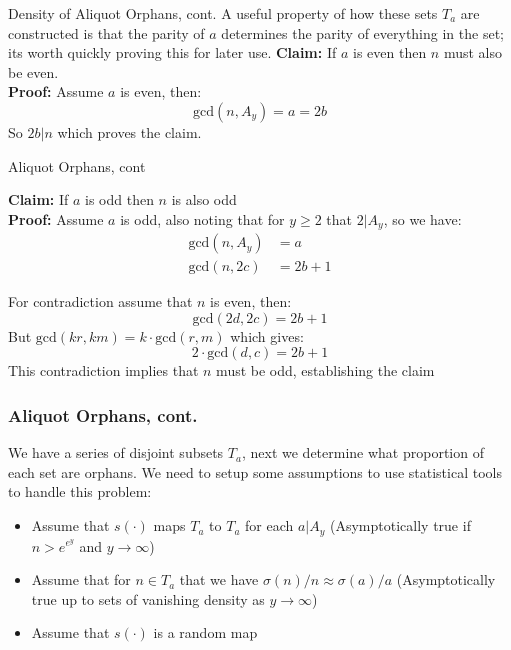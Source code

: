 \documentclass{beamer}
\begin{document}
\begin{frame}{Density of Aliquot Orphans, cont.}
A useful property of how these sets $T_a$ are constructed is that the parity of $a$ determines the parity of everything in the set; its worth quickly proving this for later use.\linebreak\linebreak
    \textbf{Claim:} If $a$ is even then $n$ must also be even.\\
   \textbf{Proof:} Assume $a$ is even, then: 
    $$\text{gcd}(n, A_y) = a = 2b$$
    So  $2b|n$ which proves the claim.\\
   
    
\end{frame}



\begin{frame}{Aliquot Orphans, cont}

    \textbf{Claim:} If $a$ is odd then $n$ is also odd\\
    \textbf{Proof:} Assume $a$ is odd, also noting that for $y \geq 2$ that $2|A_y$, so we have: 
    \begin{align*}
        \text{gcd}(n, A_y) &= a\\
        \text{gcd}(n, 2c) &= 2b+1
    \end{align*}

    For contradiction assume that $n$ is even, then:
     $$\text{gcd}(2d, 2c) = 2b+1$$
    But $\text{gcd}(kr, km) = k\cdot \text{gcd}(r, m)$  which gives: \textcolor{blue}{\cite{gcd}}
    $$2 \cdot \text{gcd}(d, c) = 2b+1$$
    This contradiction implies that $n$ must be odd, establishing the claim
   
\end{frame} 



\begin{frame}
\frametitle{Aliquot Orphans, cont.}
   We have a series of disjoint subsets $T_a$, next we determine what proportion of each set are orphans. We need to setup some assumptions to use statistical tools to handle this problem:
\begin{itemize}
    \item Assume that $s(\cdot)$ maps $T_a$ to $T_a$ for each $a | A_y$ (Asymptotically true if $n > e^{e^y}$ and $y \to \infty$)
    \item Assume that for $n \in T_a $ that we have $\sigma(n)/n \approx \sigma(a)/a $ (Asymptotically true up to sets of vanishing density as $y \to \infty$)
    \item Assume that $s(\cdot)$ is a random map
\end{itemize}
\end{frame}
\end{document}

